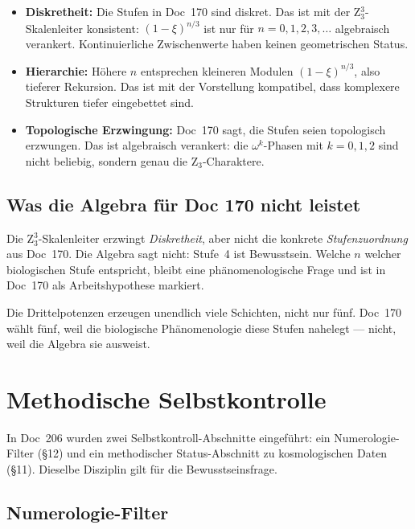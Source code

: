 \begin{itemize}
\item \textbf{Diskretheit:} Die Stufen in Doc~170 sind diskret. Das ist mit der Z$_3^3$-Skalenleiter konsistent: $(1-\xi)^{n/3}$ ist nur für $n = 0, 1, 2, 3, \dots$ algebraisch verankert. Kontinuierliche Zwischenwerte haben keinen geometrischen Status.
\item \textbf{Hierarchie:} Höhere $n$ entsprechen kleineren Modulen $(1-\xi)^{n/3}$, also tieferer Rekursion. Das ist mit der Vorstellung kompatibel, dass komplexere Strukturen tiefer eingebettet sind.
\item \textbf{Topologische Erzwingung:} Doc~170 sagt, die Stufen seien \glqq topologisch erzwungen\grqq{}. Das ist algebraisch verankert: die $\omega^k$-Phasen mit $k = 0, 1, 2$ sind nicht beliebig, sondern genau die Z$_3$-Charaktere.
\end{itemize}

\subsection{Was die Algebra für Doc 170 nicht leistet}

\begin{important}
Die Z$_3^3$-Skalenleiter erzwingt \emph{Diskretheit}, aber nicht die konkrete \emph{Stufenzuordnung} aus Doc~170. Die Algebra sagt nicht: \glqq Stufe~4 ist Bewusstsein\grqq{}. Welche $n$ welcher biologischen Stufe entspricht, bleibt eine phänomenologische Frage und ist in Doc~170 als Arbeitshypothese markiert.
\end{important}

Die Drittelpotenzen erzeugen unendlich viele Schichten, nicht nur fünf. Doc~170 wählt fünf, weil die biologische Phänomenologie diese Stufen nahelegt — nicht, weil die Algebra sie ausweist.

\section{Methodische Selbstkontrolle}\label{sec:methodik}

In Doc~206 wurden zwei Selbstkontroll-Abschnitte eingeführt: ein Numerologie-Filter (\S12) und ein methodischer Status-Abschnitt zu kosmologischen Daten (\S11). Dieselbe Disziplin gilt für die Bewusstseinsfrage.

\subsection{Numerologie-Filter}

